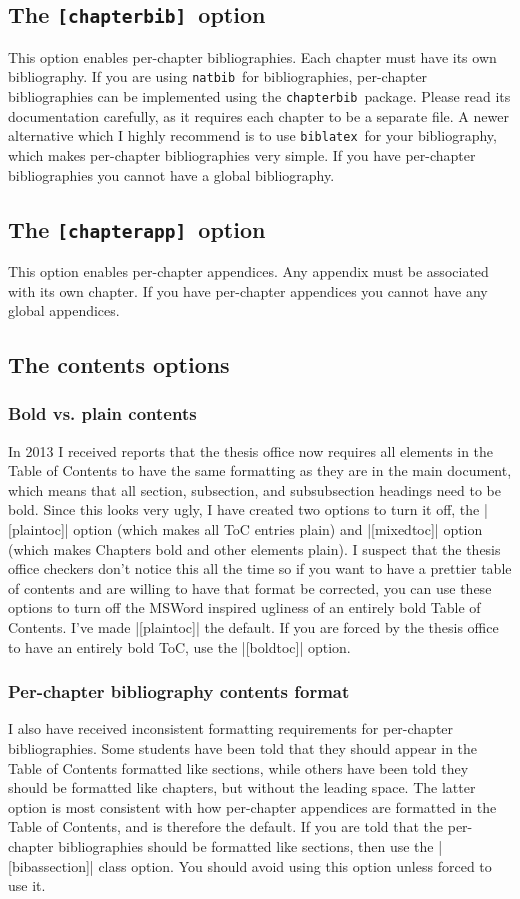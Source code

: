 \documentclass[11pt]{article}
\newcommand*{\pkg}[1]{\texttt{#1}}
\begin{document}
\subsection{The \pkg{[chapterbib]}~option}
This option enables per-chapter bibliographies. Each chapter must have its own bibliography. If you are using \pkg{natbib}\ for bibliographies, per-chapter bibliographies can be implemented using the \pkg{chapterbib}\ package. Please read its documentation carefully, as it requires each chapter to be a separate file. A newer alternative which I highly recommend is to use \pkg{biblatex}\ for your bibliography, which makes per-chapter bibliographies very simple. If you have per-chapter bibliographies you cannot have a global bibliography.
\subsection{The \pkg{[chapterapp]}~option}
This option enables per-chapter appendices. Any appendix must be associated with its own chapter. If you have per-chapter appendices you cannot have any global appendices. 
\subsection{The contents options}
\subsubsection{Bold vs. plain contents}
In 2013 I received reports that the thesis office now requires all elements in the Table of Contents to have the same formatting as they are in the main document, which means that all section, subsection, and subsubsection headings need to be bold.  Since this looks very ugly, I have created two options to turn it off, the |[plaintoc]| option (which makes all ToC entries plain) and |[mixedtoc]| option (which makes Chapters bold and other elements plain). I suspect that the thesis office checkers don't notice this all the time so if you want to have a prettier table of contents and are willing to have that format be corrected, you can use these options to turn off the MSWord inspired ugliness of an entirely bold Table of Contents. I've made |[plaintoc]| the default.  If you are forced by the thesis office to have an entirely bold ToC, use the |[boldtoc]| option.

\subsubsection{Per-chapter bibliography contents format}
I also have received inconsistent formatting requirements for per-chapter bibliographies. Some students have been told that they should appear in the Table of Contents formatted like sections, while others have been told they should be formatted like chapters, but without the leading space. The latter option is most consistent with how per-chapter appendices are formatted in the Table of Contents, and is therefore the default. If you are told that the per-chapter bibliographies should be formatted like sections, then use the |[bibassection]| class option. You should avoid using this option unless forced to use it.  
\end{document}
